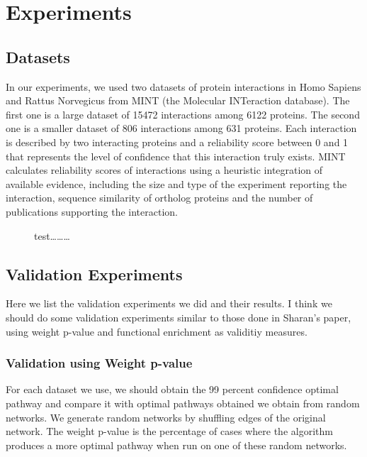 \documentclass{ws-procs11x85}
\begin{document}
\section{Experiments}

\subsection{Datasets}
In our experiments, we used two datasets of protein interactions
in Homo Sapiens and Rattus Norvegicus from MINT\cite{mint1} (the Molecular
INTeraction database). The first one is a large dataset of 15472 interactions
among 6122 proteins. The second one is a smaller dataset of 806 interactions
among 631 proteins. Each interaction is described by two interacting proteins and a
reliability score between 0 and 1 that represents the level of confidence that
this interaction truly exists. MINT calculates reliability scores of
interactions using a heuristic integration of available evidence, including the
size and type of the experiment reporting the interaction, sequence similarity
of ortholog proteins and the number of publications supporting the
interaction\cite{mint2n}.


\begin{figure}[h]
\centerline{}
\caption{test\ldots\ldots\ldots}
\end{figure}


\subsection{Validation Experiments}
Here we list the validation experiments we did and their results. I think we
should do some validation experiments similar to those done in Sharan's paper,
using weight p-value and functional enrichment as validitiy measures.

\subsubsection{Validation using Weight p-value}
For each dataset we use, we should obtain the 99 percent confidence optimal
pathway and compare it with optimal pathways obtained we obtain from random
networks. We generate random networks by shuffling edges of the original
network. The weight p-value is the percentage of cases where the algorithm
produces a more optimal pathway when run on one of these random networks.
\end{document}
